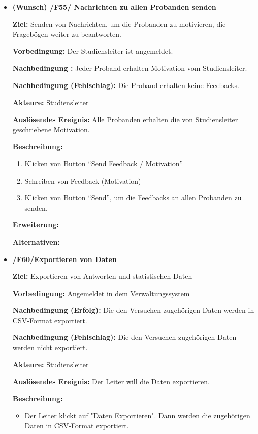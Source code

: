 \documentclass[a4paper]{scrreprt}
\begin{document}
\begin{itemize}
                \item \textbf{(Wunsch) /F55/ Nachrichten zu allen \gls{Proband}en senden}
                \par \textbf{Ziel: }Senden von Nachrichten, um die \gls{Proband}en zu motivieren, die Fragebögen weiter zu beantworten.
                \par \textbf{Vorbedingung: }Der \gls{Studiensleiter} ist angemeldet.
                \par \textbf{Nachbedingung : }Jeder \gls{Proband} erhalten Motivation vom \gls{Studiensleiter}.
                \par \textbf{Nachbedingung (Fehlschlag): }Die \gls{Proband} erhalten keine Feedbacks.
                \par \textbf{Akteure: }\gls{Studiensleiter}
                \par \textbf{Auslösendes Ereignis: }Alle \gls{Proband}en erhalten die von \gls{Studiensleiter} geschriebene Motivation.
                \par \textbf{Beschreibung: }
                \begin{enumerate}
                    \item Klicken von Button ``Send Feedback / Motivation''
                    \item Schreiben von Feedback (Motivation)
                    \item Klicken von Button ``Send'', um die Feedbacks an allen \gls{Proband}en zu senden.
                \end{enumerate}
                \par \textbf{Erweiterung: }
                \par \textbf{Alternativen: }


                \item \textbf{/F60/Exportieren von Daten}

                \par \textbf{Ziel: }Exportieren von Antworten und statistischen Daten
                \par \textbf{Vorbedingung: }Angemeldet in dem Verwaltungssystem
                \par \textbf{Nachbedingung (Erfolg): }Die den Versuchen zugehörigen Daten werden in CSV-Format exportiert.
                \par \textbf{Nachbedingung (Fehlschlag): }Die den Versuchen zugehörigen Daten werden nicht exportiert.
                \par \textbf{Akteure: }\gls{Studiensleiter}
                \par \textbf{Auslösendes Ereignis: }Der Leiter will die Daten exportieren.
                \par \textbf{Beschreibung: }
                \begin{itemize}
                    \item Der Leiter klickt auf "Daten Exportieren". Dann werden die zugehörigen Daten in CSV-Format exportiert.
                \end{itemize}
            \end{itemize}
\end{document}
